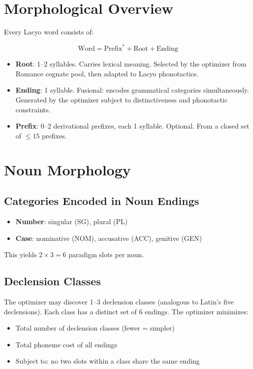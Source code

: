\documentclass[12pt]{book}
\begin{document}
\section{Morphological Overview}

Every Lacyo word consists of:

\begin{equation}
\text{Word} = \text{Prefix}^* + \text{Root} + \text{Ending}
\end{equation}

\begin{itemize}
  \item \textbf{Root}: 1--2 syllables. Carries lexical meaning. Selected by
        the optimizer from Romance cognate pool, then adapted to Lacyo
        phonotactics.
  \item \textbf{Ending}: 1 syllable. Fusional: encodes grammatical categories
        simultaneously. Generated by the optimizer subject to distinctiveness
        and phonotactic constraints.
  \item \textbf{Prefix}: 0--2 derivational prefixes, each 1 syllable.
        Optional. From a closed set of $\leq 15$ prefixes.
\end{itemize}

\section{Noun Morphology}
\label{sec:nouns}

\subsection{Categories Encoded in Noun Endings}

\begin{itemize}
  \item \textbf{Number}: singular (SG), plural (PL)
  \item \textbf{Case}: nominative (NOM), accusative (ACC), genitive (GEN)
\end{itemize}

\noindent This yields $2 \times 3 = 6$ paradigm slots per noun.

\subsection{Declension Classes}

The optimizer may discover 1--3 declension classes (analogous to Latin's
five declensions). Each class has a distinct set of 6 endings.
The optimizer minimizes:
\begin{itemize}
  \item Total number of declension classes (fewer = simpler)
  \item Total phoneme cost of all endings
  \item Subject to: no two slots within a class share the same ending
\end{itemize}
\end{document}
